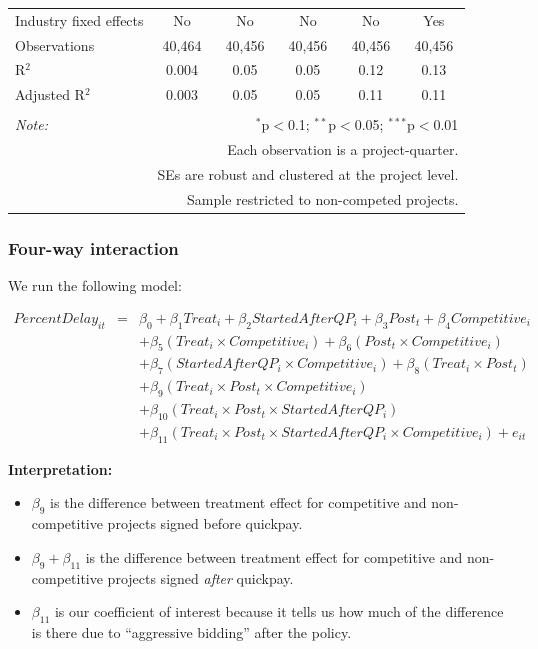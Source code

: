 \documentclass[
]{article}
\providecommand{\tightlist}{%
  \setlength{\itemsep}{0pt}\setlength{\parskip}{0pt}}
\begin{document}
\begin{table}[H]
\begin{tabular}{@{\extracolsep{-2pt}}lccccc}
Industry fixed effects & No & No & No & No & Yes \\ 
Observations & 40,464 & 40,456 & 40,456 & 40,456 & 40,456 \\ 
R$^{2}$ & 0.004 & 0.05 & 0.05 & 0.12 & 0.13 \\ 
Adjusted R$^{2}$ & 0.003 & 0.05 & 0.05 & 0.11 & 0.11 \\ 
\hline 
\hline \\[-1.8ex] 
\textit{Note:}  & \multicolumn{5}{r}{$^{*}$p$<$0.1; $^{**}$p$<$0.05; $^{***}$p$<$0.01} \\ 
 & \multicolumn{5}{r}{Each observation is a project-quarter.} \\ 
 & \multicolumn{5}{r}{SEs are robust and clustered at the project level.} \\ 
 & \multicolumn{5}{r}{Sample restricted to non-competed projects.} \\ 
\end{tabular} 
\end{table}

\hypertarget{four-way-interaction}{%
\subsubsection{Four-way interaction}\label{four-way-interaction}}

We run the following model:

\[\begin{aligned} PercentDelay_{it} &=& \beta_0 +\beta_1 Treat_i+ \beta_2 StartedAfterQP_i+ \beta_3 Post_t+ \beta_4 Competitive_i\\ && +  \beta_5 (Treat_i \times Competitive_i) + \beta_6 (Post_t \times Competitive_i)\\ && +  \beta_7 (StartedAfterQP_i \times Competitive_i) +\beta_8 (Treat_i \times Post_t)\\ && + \beta_9 (Treat_i \times Post_t \times Competitive_i) \\ && + \beta_{10} (Treat_i \times Post_t \times StartedAfterQP_i )\\ && + \beta_{11} (Treat_i \times Post_t \times StartedAfterQP_i \times Competitive_i) + e_{it} \end{aligned}\]

\textbf{Interpretation:}

\begin{itemize}
\tightlist
\item
  \(\beta_9\) is the difference between treatment effect for competitive
  and non-competitive projects signed before quickpay.
\item
  \(\beta_9 + \beta_{11}\) is the difference between treatment effect
  for competitive and non-competitive projects signed \emph{after}
  quickpay.
\item
  \(\beta_{11}\) is our coefficient of interest because it tells us how
  much of the difference is there due to ``aggressive bidding'' after
  the policy.
\end{itemize}
\end{document}
